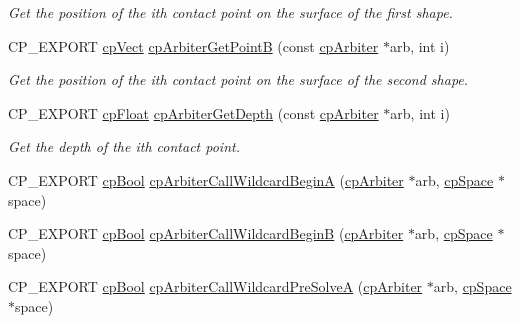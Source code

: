 \begin{DoxyCompactItemize}
\begin{DoxyCompactList}\small\item\em Get the position of the {\ttfamily ith} contact point on the surface of the first shape. \end{DoxyCompactList}\item 
\mbox{\label{group__cp_arbiter_ga5f52d875b680592bc657c4ef4608a3c4}} 
C\+P\+\_\+\+E\+X\+P\+O\+RT \mbox{\hyperlink{structcp_vect}{cp\+Vect}} \mbox{\hyperlink{group__cp_arbiter_ga5f52d875b680592bc657c4ef4608a3c4}{cp\+Arbiter\+Get\+PointB}} (const \mbox{\hyperlink{structcp_arbiter}{cp\+Arbiter}} $\ast$arb, int i)
\begin{DoxyCompactList}\small\item\em Get the position of the {\ttfamily ith} contact point on the surface of the second shape. \end{DoxyCompactList}\item 
\mbox{\label{group__cp_arbiter_ga7946b026663db9e03cacefb655369cd8}} 
C\+P\+\_\+\+E\+X\+P\+O\+RT \mbox{\hyperlink{group__basic_types_gac1ed65573e035bf892505768c852d8d3}{cp\+Float}} \mbox{\hyperlink{group__cp_arbiter_ga7946b026663db9e03cacefb655369cd8}{cp\+Arbiter\+Get\+Depth}} (const \mbox{\hyperlink{structcp_arbiter}{cp\+Arbiter}} $\ast$arb, int i)
\begin{DoxyCompactList}\small\item\em Get the depth of the {\ttfamily ith} contact point. \end{DoxyCompactList}\item 
C\+P\+\_\+\+E\+X\+P\+O\+RT \mbox{\hyperlink{group__basic_types_gabc5e752c48f3449ca26ef413ecbd647e}{cp\+Bool}} \mbox{\hyperlink{group__cp_arbiter_ga820d3549634a11d573eaa97923d59597}{cp\+Arbiter\+Call\+Wildcard\+BeginA}} (\mbox{\hyperlink{structcp_arbiter}{cp\+Arbiter}} $\ast$arb, \mbox{\hyperlink{structcp_space}{cp\+Space}} $\ast$space)
\item 
C\+P\+\_\+\+E\+X\+P\+O\+RT \mbox{\hyperlink{group__basic_types_gabc5e752c48f3449ca26ef413ecbd647e}{cp\+Bool}} \mbox{\hyperlink{group__cp_arbiter_ga7a0a1ad2040728e877d72ff16868fcef}{cp\+Arbiter\+Call\+Wildcard\+BeginB}} (\mbox{\hyperlink{structcp_arbiter}{cp\+Arbiter}} $\ast$arb, \mbox{\hyperlink{structcp_space}{cp\+Space}} $\ast$space)
\item 
C\+P\+\_\+\+E\+X\+P\+O\+RT \mbox{\hyperlink{group__basic_types_gabc5e752c48f3449ca26ef413ecbd647e}{cp\+Bool}} \mbox{\hyperlink{group__cp_arbiter_ga3e69fd89f304026f6f5248bc49fd6bba}{cp\+Arbiter\+Call\+Wildcard\+Pre\+SolveA}} (\mbox{\hyperlink{structcp_arbiter}{cp\+Arbiter}} $\ast$arb, \mbox{\hyperlink{structcp_space}{cp\+Space}} $\ast$space)

\end{DoxyCompactItemize}
